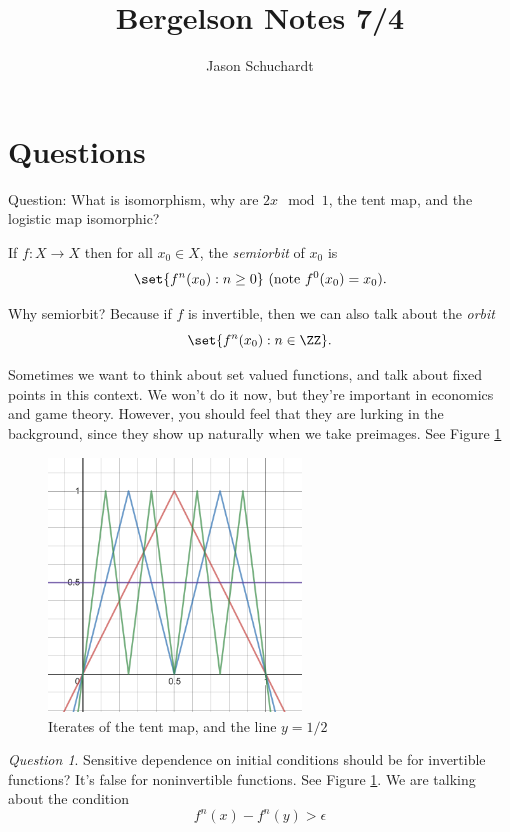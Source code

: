 \documentclass{article}
\title{Bergelson Notes 7/4}
\author{Jason Schuchardt}
\theoremstyle{remark}
\newtheorem*{question}{Question}
\begin{document}
\maketitle

\section{Questions}

Question: What is isomorphism, why are
$2x\mod{1}$, the tent map, and the logistic
map isomorphic?

\begin{definition}
    If $f:X\to X$ then for all $x_0\in X$,
    the \emph{semiorbit} of $x_0$ is
    \[ \set{f^n(x_0): n\ge 0} \text{ (note $f^0(x_0)=x_0$)}. \]

    Why semiorbit? Because if $f$ is invertible, then we 
    can also talk about the \emph{orbit}
    \[ \set{f^n(x_0): n\in\ZZ}.\]
\end{definition}

Sometimes we want to think about set valued functions, and 
talk about fixed points in this context. We won't do it 
now, but they're important in economics and game theory.
However, you should feel that they are lurking in the
background, since they show up naturally when 
we take preimages. See Figure \ref{fig:preimages}

\begin{figure}
    \centering
    \includegraphics[width=0.6\textwidth]{tent-preimage.png}
    \caption{Iterates of the tent map, and the line $y=1/2$}
    \label{fig:preimages}
\end{figure}

\begin{question}
Sensitive dependence on initial conditions 
should be for invertible 
functions? It's false for noninvertible functions. 
See Figure \ref{fig:preimages}.
We are talking about the condition
\[ f^n(x) - f^n(y) > \epsilon \]
\end{question}
\end{document}
